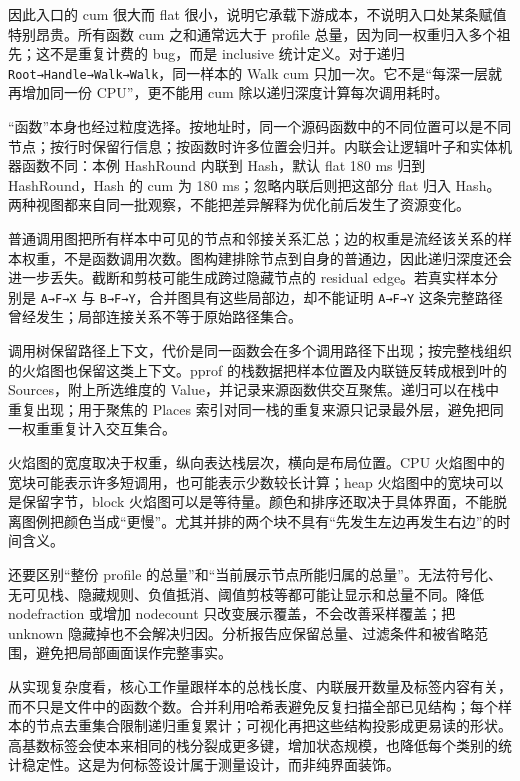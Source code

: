 \documentclass[UTF8,fontset=fandol,openany,11pt]{ctexbook}
\begin{document}
因此入口的 cum 很大而 flat 很小，说明它承载下游成本，不说明入口处某条赋值特别昂贵。所有函数 cum 之和通常远大于 profile 总量，因为同一权重归入多个祖先；这不是重复计费的 bug，而是 inclusive 统计定义。对于递归 \texttt{Root→Handle→Walk→Walk}，同一样本的 Walk cum 只加一次。它不是“每深一层就再增加同一份 CPU”，更不能用 cum 除以递归深度计算每次调用耗时。\cite{pp-graph}


“函数”本身也经过粒度选择。按地址时，同一个源码函数中的不同位置可以是不同节点；按行时保留行信息；按函数时许多位置会归并。内联会让逻辑叶子和实体机器函数不同：本例 HashRound 内联到 Hash，默认 flat 180 ms 归到 HashRound，Hash 的 cum 为 180 ms；忽略内联后则把这部分 flat 归入 Hash。两种视图都来自同一批观察，不能把差异解释为优化前后发生了资源变化。\cite{pp-scale}\cite{pp-graph}\cite{pp-teaching}


普通调用图把所有样本中可见的节点和邻接关系汇总；边的权重是流经该关系的样本权重，不是函数调用次数。图构建排除节点到自身的普通边，因此递归深度还会进一步丢失。截断和剪枝可能生成跨过隐藏节点的 residual edge。若真实样本分别是 \texttt{A→F→X} 与 \texttt{B→F→Y}，合并图具有这些局部边，却不能证明 \texttt{A→F→Y} 这条完整路径曾经发生；局部连接关系不等于原始路径集合。\cite{pp-graph}


调用树保留路径上下文，代价是同一函数会在多个调用路径下出现；按完整栈组织的火焰图也保留这类上下文。pprof 的栈数据把样本位置及内联链反转成根到叶的 Sources，附上所选维度的 Value，并记录来源函数供交互聚焦。递归可以在栈中重复出现；用于聚焦的 Places 索引对同一栈的重复来源只记录最外层，避免把同一权重重复计入交互集合。\cite{pp-flame}


火焰图的宽度取决于权重，纵向表达栈层次，横向是布局位置。CPU 火焰图中的宽块可能表示许多短调用，也可能表示少数较长计算；heap 火焰图中的宽块可以是保留字节，block 火焰图可以是等待量。颜色和排序还取决于具体界面，不能脱离图例把颜色当成“更慢”。尤其并排的两个块不具有“先发生左边再发生右边”的时间含义。\cite{pp-flame}\cite{pp-proto}


还要区别“整份 profile 的总量”和“当前展示节点所能归属的总量”。无法符号化、无可见栈、隐藏规则、负值抵消、阈值剪枝等都可能让显示和总量不同。降低 nodefraction 或增加 nodecount 只改变展示覆盖，不会改善采样覆盖；把 unknown 隐藏掉也不会解决归因。分析报告应保留总量、过滤条件和被省略范围，避免把局部画面误作完整事实。\cite{pp-filter}\cite{pp-total}\cite{pp-graph}


从实现复杂度看，核心工作量跟样本的总栈长度、内联展开数量及标签内容有关，而不只是文件中的函数个数。合并利用哈希表避免反复扫描全部已见结构；每个样本的节点去重集合限制递归重复累计；可视化再把这些结构投影成更易读的形状。高基数标签会使本来相同的栈分裂成更多键，增加状态规模，也降低每个类别的统计稳定性。这是为何标签设计属于测量设计，而非纯界面装饰。\cite{pp-merge}\cite{pp-graph}
\end{document}

